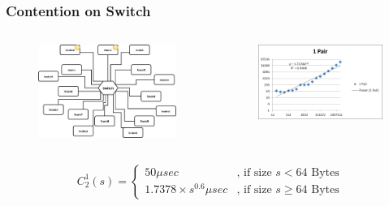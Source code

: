 \documentclass{beamer}
\begin{document}
\begin{frame}
\frametitle{Contention on Switch}
\begin{columns}[c]

\begin{figure}
\includegraphics[width=\linewidth,height=\textheight,keepaspectratio]{congestion1.jpg}
\end{figure}

\begin{figure}
\includegraphics[width=\linewidth,height=\textheight,keepaspectratio]{picture4.jpg}
\end{figure}

\end{columns}
\begin{block}{}
\begin{equation*}
C_2 ^1(s)=\begin{cases}
50 \mu sec & \text{, if size }s < 64 \text{ Bytes} \\
1.7378\times s^{0.6} \mu sec & \text{, if size } s \geq 64 \text{ Bytes}
\end{cases}
\end{equation*}
\end{block}

\end{frame}
\end{document}
